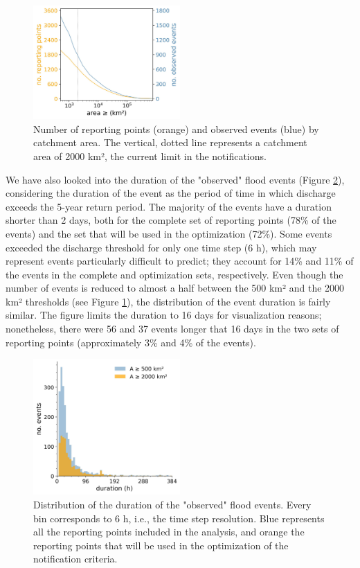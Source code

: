 \documentclass[preprint,12pt]{elsarticle}
\begin{document}
\begin{figure}
    \centering
    \includegraphics[width=0.5\textwidth]{figures/points_observedEvents_vs_area_2000km2_1239points.jpg}
    \caption{Number of reporting points (orange) and observed events (blue) by catchment area. The vertical, dotted line represents a catchment area of 2000 km², the current limit in the notifications.}
    \label{fig:observed_vs_area}
\end{figure}

We have also looked into the duration of the "observed" flood events (Figure \ref{fig:event_duration}), considering the duration of the event as the period of time in which discharge exceeds the 5-year return period. The majority of the events have a duration shorter than 2 days, both for the complete set of reporting points (78\% of the events) and the set that will be used in the optimization (72\%). Some events exceeded the discharge threshold for only one time step (6 h), which may represent events particularly difficult to predict; they account for 14\% and 11\% of the events in the complete and optimization sets, respectively. Even though the number of events is reduced to almost a half between the 500 km² and the 2000 km² thresholds (see Figure \ref{fig:observed_vs_area}), the distribution of the event duration is fairly similar. The figure limits the duration to 16 days for visualization reasons; nonetheless, there were 56 and 37 events longer that 16 days in the two sets of reporting points (approximately 3\% and 4\% of the events).

\begin{figure}
    \centering
    \includegraphics[width=0.5\textwidth]{figures/duration_distribution_2371points.jpg}
    \caption{Distribution of the duration of the "observed" flood events. Every bin corresponds to 6 h, i.e., the time step resolution. Blue represents all the reporting points included in the analysis, and orange the reporting points that will be used in the optimization of the notification criteria.}
    \label{fig:event_duration}
\end{figure}
\end{document}
